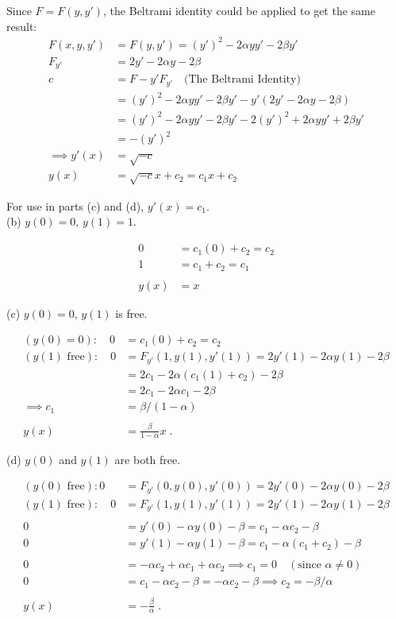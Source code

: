 \documentclass[12pt]{article}
\begin{document}
\begin{enumerate}
Since $F = F(y,y')$, the Beltrami identity could be applied to get the same result: 
\begin{align*}
F(x,y,y') &= F(y,y') = (y')^2 -2\alpha y y' - 2\beta y' \\
F_{y'} &= 2y' - 2\alpha y - 2\beta \\
c &= F - y'F_{y'} \quad \text{(The Beltrami Identity)} \\
&= (y')^2 -2\alpha y y' - 2\beta y' - y'(2y' - 2\alpha y - 2\beta )\\
&= (y')^2 -2\alpha y y' - 2\beta y' - 2(y')^2 + 2\alpha y y' + 2\beta y' \\
&= -(y')^2 \\
\implies y'(x) &= \sqrt{-c} \\
y(x) &= \sqrt{-c}x + c_2 = c_1x + c_2
\end{align*}


For use in parts (c) and (d), $y'(x) = c_1$.\\

\noindent (b)\,\,$y(0) = 0, \,y(1) = 1$.

\begin{align*}
0 &= c_1(0) + c_2 = c_2 \\
1 &= c_1 + c_2 = c_1 \\
\\
y(x) &= x
\end{align*}

\noindent (c)\,\,$y(0) = 0$, $y(1)$ is free.

\begin{align*}
(y(0) = 0): \quad 0 &= c_1(0) + c_2 = c_2 \\
(y(1) \text{ free}): \quad 0 &= F_{y'}(1,y(1),y'(1)) = 2y'(1) - 2\alpha y(1) - 2\beta \\
&= 2c_1 - 2\alpha (c_1(1) + c_2) - 2\beta \\
&= 2c_1 - 2\alpha c_1 - 2\beta \\
\implies c_1 &= \beta / (1-\alpha)\\
\\
y(x) &= \frac{\beta}{1-\alpha}x \;.
\end{align*}
$$ $$

\noindent (d)\,\,$y(0)$ and $y(1)$ are both free.

\begin{align*}
(y(0) \text{ free}): 0 &= F_{y'}(0,y(0),y'(0)) = 2y'(0) - 2\alpha y(0) - 2\beta \\
(y(1) \text{ free}): \quad 0 &= F_{y'}(1,y(1),y'(1)) = 2y'(1) - 2\alpha y(1) - 2\beta \\
\\
0 &= y'(0) - \alpha y(0) - \beta = c_1 - \alpha c_2 - \beta \\
0 &= y'(1) - \alpha y(1) - \beta  = c_1 - \alpha (c_1 + c_2) - \beta\\
\\
0 &= -\alpha c_2 + \alpha c_1 + \alpha c_2 \implies c_1 = 0 \quad (\text{since } \alpha \neq 0)  \\
0&= c_1 - \alpha c_2 - \beta = -\alpha c_2 - \beta \implies c_2 = - \beta / \alpha \\
\\
y(x) &= -\frac{\beta}{\alpha} \; .
\end{align*}

\end{enumerate}
\end{document}
